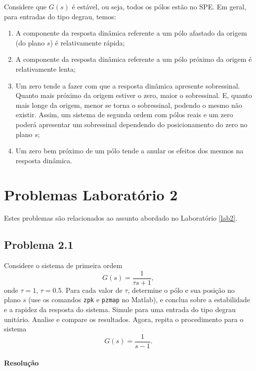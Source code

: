 \documentclass[
]{book}
\providecommand{\tightlist}{%
  \setlength{\itemsep}{0pt}\setlength{\parskip}{0pt}}
\theoremstyle{definition}
\theoremstyle{definition}
\theoremstyle{definition}
\theoremstyle{remark}
\begin{document}
Considere que \(G(s)\) é estável, ou seja, todos os pólos estão no SPE. Em geral, para entradas do tipo degrau, temos:

\begin{enumerate}
\def\labelenumi{\arabic{enumi}.}
\tightlist
\item
  A componente da resposta dinâmica referente a um pólo afastado da origem (do plano \(s\)) é relativamente rápida;
\item
  A componente da resposta dinâmica referente a um pólo próximo da origem é relativamente lenta;
\item
  Um zero tende a fazer com que a resposta dinâmica apresente sobressinal. Quanto mais próximo da origem estiver o zero, maior o sobressinal. E, quanto mais longe da origem, menor se torna o sobressinal, podendo o mesmo não existir. Assim, um sistema de segunda ordem com pólos reais e um zero poderá apresentar um sobressinal dependendo do posicionamento do zero no plano \(s\);
\item
  Um zero bem próximo de um pólo tende a anular os efeitos dos mesmos na resposta dinâmica.
\end{enumerate}

\hypertarget{problemas-laboratuxf3rio-2}{%
\chapter*{Problemas Laboratório 2}\label{problemas-laboratuxf3rio-2}}

Estes problemas são relacionados ao assunto abordado no Laboratório \ref{lab2}.

\hypertarget{problema-2.1}{%
\section*{Problema 2.1}\label{problema-2.1}}

Considere o sistema de primeira ordem
\[
G(s) = \frac{1}{\tau s +1},
\]
onde \(\tau = 1\), \(\tau = 0.5\). Para cada valor de \(\tau\), determine o pólo e sua posição no plano \(s\) (use os comandos \texttt{zpk} e \texttt{pzmap} no Matlab), e conclua sobre a estabilidade e a rapidez da resposta do sistema. Simule para uma entrada do tipo degrau unitário. Analise e compare os resultados. Agora, repita o procedimento para o sistema
\[
G(s) = \frac{1}{s-1}.
\]

\hypertarget{resoluuxe7uxe3o}{%
\subsubsection*{Resolução}\label{resoluuxe7uxe3o}}
\end{document}
